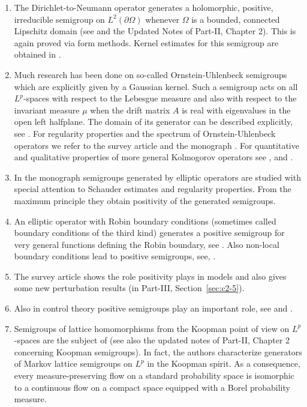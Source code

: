 \begin{enumerate}
\item 
The Dirichlet-to-Neumann operator generates a holomorphic, positive, irreducible semigroup on $L^{2}(\partial\Omega)$ whenever $ \Omega$  is a bounded, connected  Lipschitz domain (see \textcite{zbmath06171001} and the Updated Notes of Part-II, Chapter 2). 
This is again proved via form methods. 
Kernel estimates for this semigroup are obtained in \textcite{zbmath07063341}.

\item 
Much research has been done on so-called Ornstein-Uhlenbeck semigroups which are  explicitly given by a Gaussian kernel. 
Such a semigroup acts on all $L^{p}$-spaces with respect to the Lebesgue measure and also with respect to the invariant measure $\mu$ when the drift matrix $A$ is real with eigenvalues in the open left halfplane. 
The domain of its generator can be described explicitly, see \textcite{zbmath02217252}. 
For regularity properties and the spectrum of Ornstein-Uhlenbeck operators we refer to the survey article \textcite{MR4176390} and the monograph \textcite{zbmath06593873}. 
For quantitative and qualitative properties of more general Kolmogorov operators see \textcite{zbmath06593873}, \textcite{zbmath01837428} and \textcite{zbmath01789518}.

\item 
In the monograph \textcite{zbmath07274768} semigroups generated by elliptic operators are studied with special attention to Schauder estimates and
regularity properties. From the maximum principle they obtain positivity
of the generated semigroups.


\item
An elliptic operator with Robin boundary conditions (sometimes called boundary conditions of the third kind) generates a positive semigroup for very general functions defining the Robin boundary, see \textcite{zbmath05551221}. 
Also  non-local boundary conditions lead to positive semigroups,  see, \eg
\textcite{arXiv:2502.03216}. 
 
\item 
The survey article \textcite{zbmath07402424} shows the role positivity plays in models and also gives some new perturbation results (in Part-III, Section~\ref{sec:c2-5}). 


\item Also in control theory positive semigroups play an important role, see \eg \textcite{zbmath04120022} and \textcite{zbmath08056303}. 

\item 
Semigroups of lattice homomorphisms from the Koopman point of view 
on $L^{p}$-spaces are the subject of \textcite{zbmath07036266} (see also the updated notes of Part-II, Chapter 2 concerning Koopman semigroups). In fact, the authors characterize generators of Markov lattice semigroups on $L^{p}$ in the Koopman spirit. As a consequence, every measure-preserving flow on a standard probability space is isomorphic to a continuous flow on a compact space equipped with a Borel probability measure.



\end{enumerate}

